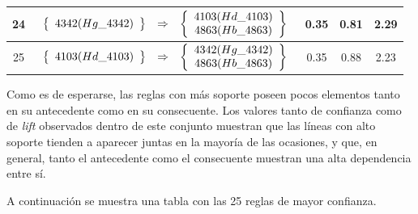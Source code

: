 \begin{longtable}{| c | l | c | c | c |}
24 & $\begin{array}{c c c}\left\{\begin{array}{c}4342 (Hg\_4342)\end{array}\right\} & \Rightarrow & \left\{\begin{array}{c}4103 (Hd\_4103) \\ 4863 (Hb\_4863)\end{array}\right\}\end{array}$ & 0.35 & 0.81 & 2.29 \\ \hline
25 & $\begin{array}{c c c}\left\{\begin{array}{c}4103 (Hd\_4103)\end{array}\right\} & \Rightarrow & \left\{\begin{array}{c}4342 (Hg\_4342) \\ 4863 (Hb\_4863)\end{array}\right\}\end{array}$ & 0.35 & 0.88 & 2.23 \\ \hline
\end{longtable}

Como es de esperarse, las reglas con más soporte poseen pocos elementos tanto en su antecedente como en su consecuente. Los valores tanto de confianza como de \textit{lift} observados dentro de este conjunto muestran que las líneas con alto soporte tienden a aparecer juntas en la mayoría de las ocasiones, y que, en general, tanto el antecedente como el consecuente muestran una alta dependencia entre sí.

A continuación se muestra una tabla con las 25 reglas de mayor confianza.

